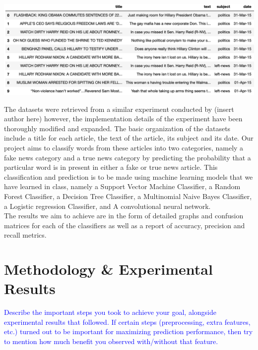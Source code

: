 \documentclass[10pt,twocolumn,letterpaper]{article}
\begin{document}
\begin{center}
\includegraphics[width=\linewidth]{Latex_Report/report/dt_example.png}
\end{center}

The datasets were retrieved from a similar experiment conducted by (insert author here) however, the implementation details of the experiment have been thoroughly modified and expanded. The basic organization of the datasets include a title for each article, the text of the article, its subject and its date. Our project aims to classify words from these articles into two categories, namely a fake news category and a true news category by predicting the probability that a particular word is in present in either a fake or true news article. This classification and prediction is to be made using machine learning models that we have learned in class, namely a Support Vector Machine Classifier, a Random Forest Classifier, a Decision Tree Classifier, a Multinomial Naive Bayes Classifier, a Logistic regression Classifier, and A convolutional neural network. \\

The results we aim to achieve are in the form of detailed graphs and confusion matrices for each of the classifiers as well as a report of accuracy, precision and recall metrics. 


\section{Methodology \& Experimental Results}

\textcolor{blue}{Describe the important steps you took to achieve your goal, alongside experimental results that followed. If certain steps (preprocessing, extra features, etc.) turned out to be important for maximizing prediction performance, then try to mention how much benefit you observed with/without that feature.}
\end{document}
